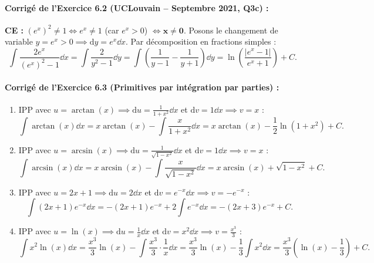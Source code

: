 \paragraph{Corrigé de l'Exercice 6.2 (UCLouvain -- Septembre 2021, Q3c) :}
\textbf{CE :} $(e^x)^2 \neq 1 \iff e^x \neq 1$ (car $e^x > 0$) $\iff \mathbf{x \neq 0}$.
Posons le changement de variable $y = e^x > 0 \implies \mathrm{d}y = e^x\dd x$. Par décomposition en fractions simples :
\[
    \int \frac{2e^x}{(e^x)^2 - 1}\dd x = \int \frac{2}{y^2 - 1}\dd y = \int \left(\frac{1}{y - 1} - \frac{1}{y + 1}\right)\dd y = \boxed{\ln\left(\frac{|e^x - 1|}{e^x + 1}\right) + C}.
\]

\paragraph{Corrigé de l'Exercice 6.3 (Primitives par intégration par parties) :}
\begin{enumerate}[label=(\alph*)]
    \item IPP avec $u = \arctan(x) \implies \mathrm{d}u = \frac{1}{1+x^2}\dd x$ et $\mathrm{d}v = 1\dd x \implies v = x$ :
    \[
        \int \arctan(x)\dd x = x\arctan(x) - \int \frac{x}{1 + x^2}\dd x = \boxed{x\arctan(x) - \frac{1}{2}\ln(1 + x^2) + C}.
    \]
    \item IPP avec $u = \arcsin(x) \implies \mathrm{d}u = \frac{1}{\sqrt{1-x^2}}\dd x$ et $\mathrm{d}v = 1\dd x \implies v = x$ :
    \[
        \int \arcsin(x)\dd x = x\arcsin(x) - \int \frac{x}{\sqrt{1 - x^2}}\dd x = \boxed{x\arcsin(x) + \sqrt{1 - x^2} + C}.
    \]
    \item IPP avec $u = 2x + 1 \implies \mathrm{d}u = 2\dd x$ et $\mathrm{d}v = e^{-x}\dd x \implies v = -e^{-x}$ :
    \[
        \int (2x + 1)e^{-x}\dd x = -(2x + 1)e^{-x} + 2\int e^{-x}\dd x = \boxed{-(2x + 3)e^{-x} + C}.
    \]
    \item IPP avec $u = \ln(x) \implies \mathrm{d}u = \frac{1}{x}\dd x$ et $\mathrm{d}v = x^2\dd x \implies v = \frac{x^3}{3}$ :
    \[
        \int x^2\ln(x)\dd x = \frac{x^3}{3}\ln(x) - \int \frac{x^3}{3}\cdot\frac{1}{x}\dd x = \frac{x^3}{3}\ln(x) - \frac{1}{3}\int x^2\dd x = \boxed{\frac{x^3}{3}\left(\ln(x) - \frac{1}{3}\right) + C}.
    \]
\end{enumerate}

